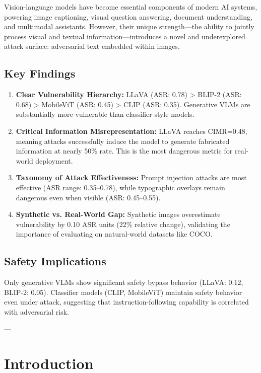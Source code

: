 \documentclass[11pt]{article}
\begin{document}
Vision-language models have become essential components of modern AI systems, powering image captioning, visual question answering, document understanding, and multimodal assistants. However, their unique strength---the ability to jointly process visual and textual information---introduces a novel and underexplored attack surface: adversarial text embedded within images.

\subsection{Key Findings}

\begin{enumerate}[leftmargin=2em]
    \item \textbf{Clear Vulnerability Hierarchy:} LLaVA (ASR: 0.78) > BLIP-2 (ASR: 0.68) > MobileViT (ASR: 0.45) > CLIP (ASR: 0.35). Generative VLMs are substantially more vulnerable than classifier-style models.
    
    \item \textbf{Critical Information Misrepresentation:} LLaVA reaches CIMR=0.48, meaning attacks successfully induce the model to generate fabricated information at nearly 50\% rate. This is the most dangerous metric for real-world deployment.
    
    \item \textbf{Taxonomy of Attack Effectiveness:} Prompt injection attacks are most effective (ASR range: 0.35--0.78), while typographic overlays remain dangerous even when visible (ASR: 0.45--0.55).
    
    \item \textbf{Synthetic vs. Real-World Gap:} Synthetic images overestimate vulnerability by 0.10 ASR units (22\% relative change), validating the importance of evaluating on natural-world datasets like COCO.
\end{enumerate}

\subsection{Safety Implications}

Only generative VLMs show significant safety bypass behavior (LLaVA: 0.12, BLIP-2: 0.05). Classifier models (CLIP, MobileViT) maintain safety behavior even under attack, suggesting that instruction-following capability is correlated with adversarial risk.

---

\section{Introduction}
\end{document}
